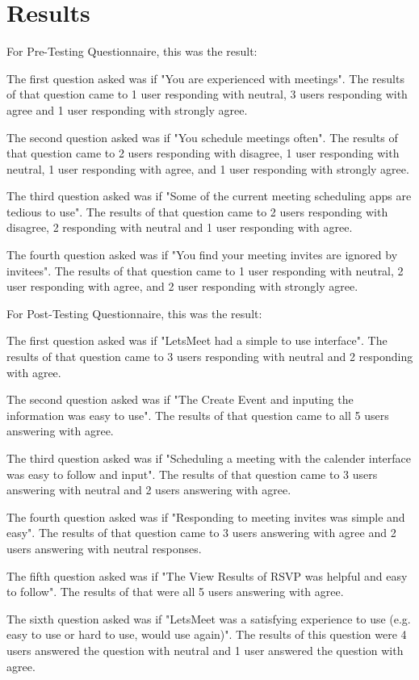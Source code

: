 \documentclass{sigchi}
\begin{document}
\section{Results}

For Pre-Testing Questionnaire, this was the result:

The first question asked was if "You are experienced with meetings". The results of that question came to 1 user responding with neutral, 3 users responding with agree and 1 user responding with strongly agree.

The second question asked was if "You schedule meetings often". The results of that question came to 2 users responding with disagree, 1 user responding with neutral, 1 user responding with agree, and 1 user responding with strongly agree.

The third question asked was if "Some of the current meeting scheduling apps are tedious to use". The results of that question came to 2 users responding with disagree, 2 responding with neutral and 1 user responding with agree.

The fourth question asked was if "You find your meeting invites are ignored by invitees". The results of that question came to 1 user responding with neutral, 2 user responding with agree, and 2 user responding with strongly agree.

For Post-Testing Questionnaire, this was the result:

The first question asked was if "LetsMeet had a simple to use interface". The results of that question came to 3 users responding with neutral and 2 responding with agree.

The second question asked was if "The Create Event and inputing the information was easy to use". The results of that question came to all 5 users answering with agree.

The third question asked was if "Scheduling a meeting with the calender interface was easy to follow and input". The results of that question came to 3 users answering with neutral and 2 users answering with agree.

The fourth question asked was if "Responding to meeting invites was simple and easy". The results of that question came to 3 users answering with agree and 2 users answering with neutral responses.

The fifth question asked was if "The View Results of RSVP was helpful and easy to follow". The results of that were all 5 users answering with agree.

The sixth question asked was if "LetsMeet was a satisfying experience to use (e.g. easy to use or hard to use, would use again)". The results of this question were 4 users answered the question with neutral and 1 user answered the question with agree.
\end{document}
